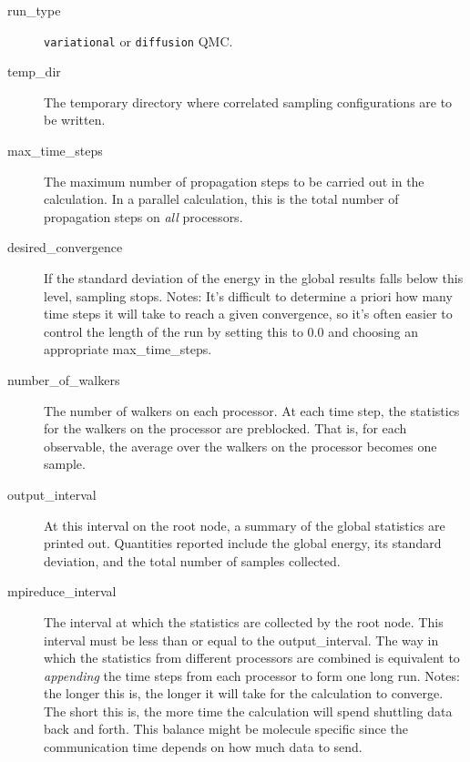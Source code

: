 \documentclass[11pt]{article}
\begin{document}
\begin{description}

\item [run\_type] \verb-variational- or \verb-diffusion- QMC.

\item [temp\_dir] The temporary directory where correlated
  sampling configurations are to be written.

\item [max\_time\_steps] The maximum number of propagation steps to be
  carried out in the calculation.  In a parallel calculation, this is
  the total number of propagation steps on \emph{all} processors. 

\item [desired\_convergence] If the standard deviation of the energy in
     the global results falls below this level, sampling stops.
     Notes: It's difficult to determine a priori how many time                                                                                                           
     steps it will take to reach a given convergence, so it's often                                                                                                      
     easier to control the length of the run by setting this to 0.0                                                                                                      
     and choosing an appropriate max\_time\_steps.  

\item [number\_of\_walkers] The number of walkers on each processor.  At
  each time step, the statistics for the walkers on the processor are
  preblocked.  That is, for each observable, the average over the
  walkers on the processor becomes one sample.   

\item [output\_interval] At this interval on the root node, a summary of
  the global statistics are printed out.  Quantities reported include
  the global energy, its standard deviation, and the total number of
  samples collected. 

\item [mpireduce\_interval] The interval at which the statistics are
  collected by the root node.  This interval must be less than or
  equal to the output\_interval.  The way in which the statistics from
  different processors are combined is equivalent to \emph{appending}
  the time steps from each processor to form one long run. 
  Notes: the longer this is, the longer it will take for the                                                                                                          
     calculation to converge. The short this is, the more time                                                                                                           
     the calculation will spend shuttling data back and forth.                                                                                      
     This balance might be molecule specific since the communication                                                                                                     
     time depends on how much data to send.  


\end{description}
\end{document}
